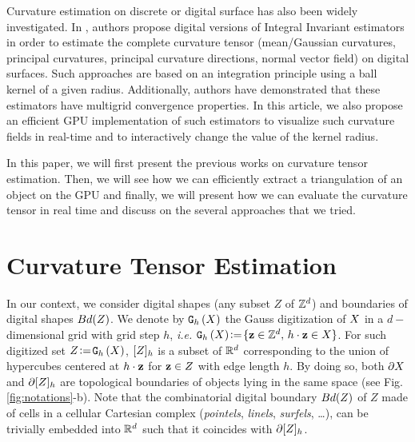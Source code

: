 \documentclass{llncs}
\begin{document}
Curvature estimation on discrete or digital surface has also been
widely investigated. In \cite{CVIU2014}, authors propose digital
versions of Integral Invariant estimators
\cite{Pottmann2007,Pottmann2009} in order to estimate the complete
curvature tensor (mean/Gaussian curvatures, principal curvatures,
principal curvature directions, normal vector field) on digital
surfaces. Such approaches are based on an integration principle using
a ball kernel of a given radius. Additionally, authors have
demonstrated that these estimators have multigrid convergence
properties. In this article, we also propose an efficient GPU
implementation of such estimators to visualize
such curvature fields in real-time and
to interactively change the
value of the kernel radius.

\vspace{0.2cm}
\color{blue}
In this paper, we will first present the previous works on
curvature tensor estimation. Then, we will see how we can
efficiently extract a triangulation of an object on the GPU
and finally, we will present how we can evaluate the curvature tensor in
real time and discuss on the several approaches that we tried.
\normalcolor




\section{Curvature Tensor Estimation}
\label{sec:curv-tens-estim}

\sloppy In our context, we consider digital shapes (any subset $Z$ of ${\mathbb{Z}}^d$)
and boundaries of digital shapes $Bd(Z)$. We denote by $\mathtt{G}_{h}\left(X\right)$ the
Gauss digitization of $X$ in a $d-$dimensional grid with grid step $h$,
\emph{i.e.}  $\mathtt{G}_{h}\left(X\right) \!\mathrel{\mathop:}=\! \{ \mathbf{z} \in {\mathbb{Z}}^d,\, h\cdot\mathbf{z}\in X\}$. For such
digitized set $Z\!\mathrel{\mathop:}=\!\mathtt{G}_{h}\left(X\right)$, $\lbrack Z \rbrack_{h}$ is a subset of ${\mathbb{R}}^d$
corresponding to the union of hypercubes centered at $h\cdot \mathbf{z}$ for $\mathbf{z}\in Z$
with edge length $h$. By doing so, both $\partial X$ and
$\partial\lbrack Z \rbrack_{h}$ are topological boundaries of objects lying in the same
space (see Fig. \ref{fig:notations}-b). Note that the combinatorial digital
boundary $Bd(Z)$ of $Z$ made of cells in a cellular Cartesian complex
(\emph{pointels}, \emph{linels}, \emph{surfels}, \ldots), can be trivially
embedded into ${\mathbb{R}}^d$ such that it coincides with $\partial\lbrack Z \rbrack_{h}$.
\end{document}
